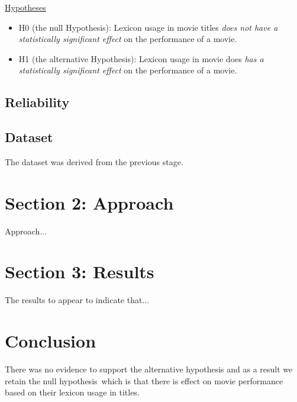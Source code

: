 \documentclass[font=10pt]{article}
\begin{document}
      \underline{Hypotheses}
      \begin{itemize}
        \item H0 (the null Hypothesis): Lexicon usage in movie titles \textit{does not have a statistically significant effect} on the performance of a movie.
        \item H1 (the alternative Hypothesis): Lexicon usage in movie does \textit{has a statistically significant effect} on the performance of a movie.
      \end{itemize}

    \subsection{Reliability}

    \subsection{Dataset}
    The dataset was derived from the previous stage.

  \section{Section 2: Approach}
  Approach...
  \section{Section 3: Results}
  The results to appear to indicate that...
  \section{Conclusion}
  There was no evidence to support the alternative hypothesis and as a result we retain the null hypothesis\
  which is that there is effect on movie performance based on their lexicon usage in titles.

  \appendix
\end{document}
